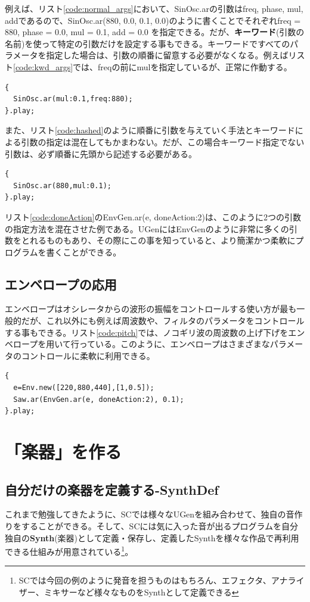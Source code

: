 \documentclass{jsarticle}
\begin{document}
例えば、リスト\ref{code:normal_args}において、SinOsc.arの引数はfreq, phase, mul, addであるので、SinOsc.ar(880, 0.0, 0.1, 0.0)のように書くことでそれぞれfreq = 880, phase = 0.0, mul = 0.1, add = 0.0 を指定できる。だが、{\bf キーワード}(引数の名前)を使って特定の引数だけを設定する事もできる。キーワードですべてのパラメータを指定した場合は、引数の順番に留意する必要がなくなる。例えばリスト\ref{code:kwd_args}では、freqの前にmulを指定しているが、正常に作動する。

\begin{lstlisting}[caption=キーワードによる引数の指定,label=code:kwd_args]
{
  SinOsc.ar(mul:0.1,freq:880);
}.play;
\end{lstlisting}

また、リスト\ref{code:hashed}のように順番に引数を与えていく手法とキーワードによる引数の指定は混在してもかまわない。だが、この場合キーワード指定でない引数は、必ず順番に先頭から記述する必要がある。

\begin{lstlisting}[caption=引数指定法の混在,label=code:hashed]
{
  SinOsc.ar(880,mul:0.1);
}.play;
\end{lstlisting}

リスト\ref{code:doneAction}のEnvGen.ar(e, doneAction:2)は、このように2つの引数の指定方法を混在させた例である。UGenにはEnvGenのように非常に多くの引数をとれるものもあり、その際にこの事を知っていると、より簡潔かつ柔軟にプログラムを書くことができる。

\subsection{エンベロープの応用}
エンベロープはオシレータからの波形の振幅をコントロールする使い方が最も一般的だが、これ以外にも例えば周波数や、フィルタのパラメータをコントロールする事もできる。リスト\ref{code:pitch}では、ノコギリ波の周波数の上げ下げをエンベロープを用いて行っている。このように、エンベロープはさまざまなパラメータのコントロールに柔軟に利用できる。

\begin{lstlisting}[caption=エンベロープの応用,label=code:pitch]
{
  e=Env.new([220,880,440],[1,0.5]);
  Saw.ar(EnvGen.ar(e, doneAction:2), 0.1);
}.play;
\end{lstlisting}

\section{「楽器」を作る}
\subsection{自分だけの楽器を定義する-SynthDef}
これまで勉強してきたように、SCでは様々なUGenを組み合わせて、独自の音作りをすることができる。そして、SCには気に入った音が出るプログラムを自分独自の{\bf Synth}(楽器)として定義・保存し、定義したSynthを様々な作品で再利用できる仕組みが用意されている\footnote{SCでは今回の例のように発音を担うものはもちろん、エフェクタ、アナライザー、ミキサーなど様々なものをSynthとして定義できる}。
\end{document}
